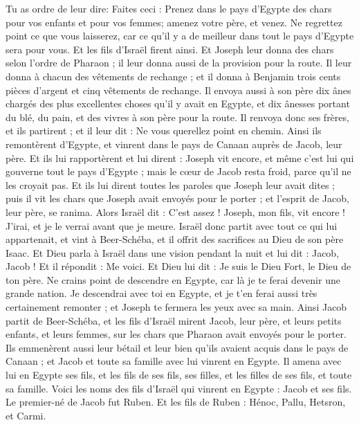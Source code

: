\begin{multicols}{2}
Tu as ordre de leur dire: Faites ceci : Prenez dans le pays d’Egypte des chars pour vos enfants et pour vos femmes; amenez votre père, et venez.
Ne regrettez point ce que vous laisserez, car ce qu’il y a de meilleur dans tout le pays d’Egypte sera pour vous.
Et les fils d'Israël firent ainsi. Et Joseph leur donna des chars selon l'ordre de Pharaon ; il leur donna aussi de la provision pour la route.
Il leur donna à chacun des vêtements de rechange ; et il donna à Benjamin trois cents pièces d'argent et cinq vêtements de rechange.
Il envoya aussi à son père dix ânes chargés des plus excellentes choses qu'il y avait en Egypte, et dix ânesses portant du blé, du pain, et des vivres à son père pour la route.
Il renvoya donc ses frères, et ils partirent ; et il leur dit : Ne vous querellez point en chemin.
Ainsi ils remontèrent d'Egypte, et vinrent dans le  pays de Canaan auprès de Jacob, leur père.
Et ils lui rapportèrent et lui dirent : Joseph vit encore, et même c’est lui qui gouverne tout le pays d'Egypte ; mais le cœur de Jacob resta froid, parce qu’il ne les croyait pas.
Et ils lui dirent toutes les paroles que Joseph leur avait dites ; puis il vit les chars que Joseph avait envoyés pour le porter ; et l'esprit de Jacob, leur père, se ranima.
Alors Israël dit : C'est assez ! Joseph, mon fils, vit encore ! J'irai, et je le verrai avant que je meure.
\VerseOne{}Israël donc partit avec tout ce qui lui appartenait, et vint à Beer-Schéba, et il offrit des sacrifices au Dieu de son père Isaac.
Et Dieu parla à Israël dans une vision pendant la nuit et lui dit : Jacob, Jacob ! Et il répondit : Me voici.
Et Dieu lui dit : Je suis le Dieu Fort, le Dieu de ton père. Ne crains point de descendre en Egypte, car là je te ferai devenir une grande nation.
Je descendrai avec toi en Egypte, et je t'en ferai aussi très certainement remonter ; et Joseph te fermera les yeux avec sa main.
Ainsi Jacob partit de Beer-Schéba, et les fils d'Israël mirent Jacob, leur père, et leurs petits enfants, et leurs femmes, sur les chars que Pharaon avait envoyés pour le porter.
Ils emmenèrent aussi leur bétail et leur bien qu'ils avaient acquis dans le pays de Canaan ; et Jacob et toute sa famille avec lui vinrent en Egypte.
Il amena avec lui en Egypte ses fils, et les fils de ses fils, ses filles, et les filles de ses fils, et toute sa famille.
Voici les noms des fils d'Israël qui vinrent en Egypte : Jacob et ses fils. Le premier-né de Jacob fut Ruben.
Et les fils de Ruben : Hénoc, Pallu, Hetsron, et Carmi.

\end{multicols}
